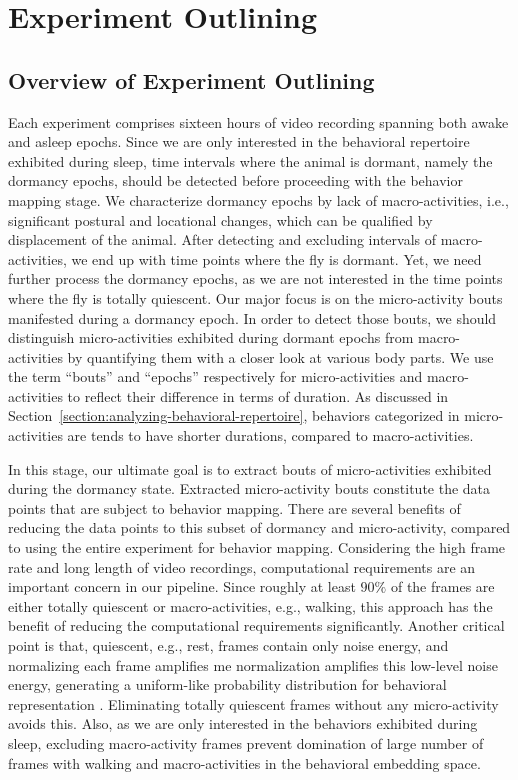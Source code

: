 \chapter{Experiment Outlining}

\section{Overview of Experiment Outlining}
Each experiment comprises sixteen hours of video recording spanning both awake and asleep epochs.
Since we are only interested in the behavioral repertoire exhibited during sleep, time intervals where the animal is dormant, namely the dormancy epochs, should be detected before proceeding with the behavior mapping stage.
We characterize dormancy epochs by lack of macro-activities, i.e., significant postural and locational changes, which can be qualified by displacement of the animal.
After detecting and excluding intervals of macro-activities, we end up with time points where the fly is dormant.
Yet, we need further process the dormancy epochs, as we are not interested in the time points where the fly is totally quiescent.
Our major focus is on the micro-activity bouts manifested during a dormancy epoch.
In order to detect those bouts, we should distinguish micro-activities exhibited during dormant epochs from macro-activities by quantifying them with a closer look at various body parts. We use the term ``bouts'' and ``epochs'' respectively for micro-activities and macro-activities to reflect their difference in terms of duration. As discussed in Section~\ref{section:analyzing-behavioral-repertoire}, behaviors categorized in micro-activities are tends to have shorter durations, compared to macro-activities.

In this stage, our ultimate goal is to extract bouts of micro-activities exhibited during the dormancy state.
Extracted micro-activity bouts constitute the data points that are subject to behavior mapping.
There are several benefits of reducing the data points to this subset of dormancy and micro-activity, compared to using the entire experiment for behavior mapping.
Considering the high frame rate and long length of video recordings, computational requirements are an important concern in our pipeline.
Since roughly at least $90\%$ of the frames are either totally quiescent or macro-activities, e.g., walking, this approach has the benefit of reducing the computational requirements significantly.
Another critical point is that, quiescent, e.g., rest, frames contain only noise energy, and normalizing each frame amplifies me normalization amplifies this low-level noise energy, generating a uniform-like probability distribution for behavioral representation \citep{todd_systematic_2017}.
Eliminating totally quiescent frames without any micro-activity avoids this.
Also, as we are only interested in the behaviors exhibited during sleep, excluding macro-activity frames prevent domination of large number of frames with walking and macro-activities in the behavioral embedding space.

